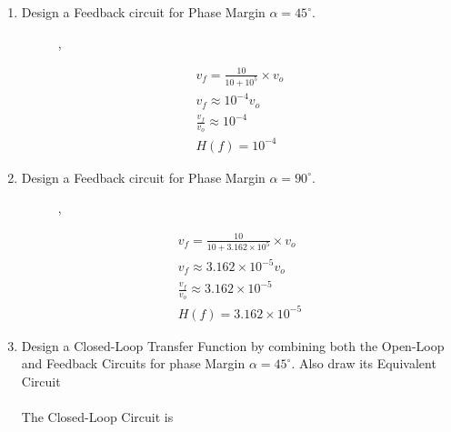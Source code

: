 \begin{enumerate}[label=\thesection.\arabic*.,ref=\thesection.\theenumi]
\item Design a Feedback circuit for Phase Margin $\alpha=45^{\circ}$.\\
\solution
\begin{figure}[ht!]
	\begin{center}
		\resizebox{\columnwidth/2}{!}{}
	\end{center},
	\caption{}
	\label{fig:ee18btech11014_alpha=45}
\end{figure}
\begin{align}
v_{f} = \frac{10}{10 + 10^{5}} \times v_{o}\\
v_{f} \approx 10^{-4} v_{o}\\
\frac{v_{f}}{v_{o}} \approx 10^{-4}\\
H(f) = 10^{-4}
\end{align}

\item Design a Feedback circuit for Phase Margin $\alpha=90^{\circ}$.\\
\solution
\begin{figure}[ht!]
	\begin{center}
		\resizebox{\columnwidth/2}{!}{}
	\end{center},
	\caption{}
	\label{fig:ee18btech11014_alpha=90}
\end{figure}
\begin{align}
v_{f} = \frac{10}{10 + 3.162\times 10^{5}} \times v_{o}\\
v_{f} \approx 3.162\times 10^{-5} v_{o}\\
\frac{v_{f}}{v_{o}} \approx 3.162\times 10^{-5}\\
H(f) = 3.162\times 10^{-5}
\end{align}

\item  Design a Closed-Loop Transfer Function by combining both the Open-Loop and Feedback Circuits for phase Margin $\alpha=45^{\circ}$. Also draw its Equivalent Circuit\\
\solution\\
The Closed-Loop Circuit is
\begin{figure}[ht!]
	\begin{center}
		\resizebox{\columnwidth}{!}{}
	\end{center}
	\caption{}
	\label{fig:ee18btech11014_Closed-Loop Circuit alpha=45}
\end{figure}


\end{enumerate}
